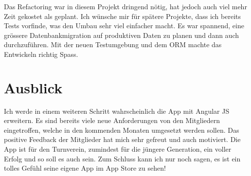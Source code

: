 Das Refactoring war in diesem Projekt dringend nötig, hat jedoch auch viel mehr Zeit gekostet als geplant. Ich wünsche mir für spätere Projekte, dass ich bereits Tests vorfinde, was den Umbau sehr viel einfacher macht. Es war spannend, eine grössere Datenbankmigration auf produktiven Daten zu planen und dann auch durchzuführen. Mit der neuen Testumgebung und dem ORM machte das Entwickeln richtig Spass.\\

\section{Ausblick}\label{fazit_ausblick}
Ich werde in einem weiteren Schritt wahrscheinlich die App mit Angular JS erweitern. Es sind bereits viele neue Anforderungen von den Mitgliedern eingetroffen, welche in den kommenden Monaten umgesetzt werden sollen. Das positive Feedback der Mitglieder hat mich sehr gefreut und auch motiviert. Die App ist für den Turnverein, zumindest für die jüngere Generation, ein voller Erfolg und so soll es auch sein. Zum Schluss kann ich nur noch sagen, es ist ein tolles Gefühl seine eigene App im App Store zu sehen!